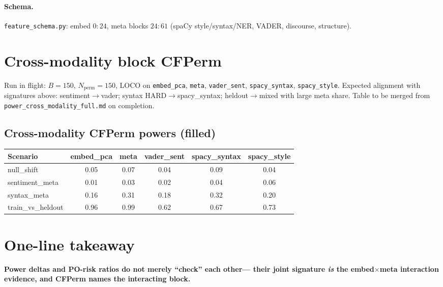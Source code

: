 \documentclass[11pt]{article}
\begin{document}
\paragraph{Schema.}
\texttt{feature\_schema.py}: embed $0{:}24$, meta blocks $24{:}61$
(spaCy style/syntax/NER, VADER, discourse, structure).

\section{Cross-modality block CFPerm}
Run in flight: $B{=}150$, $N_{\mathrm{perm}}{=}150$, LOCO on
\texttt{embed\_pca}, \texttt{meta}, \texttt{vader\_sent}, \texttt{spacy\_syntax},
\texttt{spacy\_style}. Expected alignment with signatures above:
sentiment$\to$vader; syntax HARD$\to$spacy\_syntax; heldout$\to$mixed with
large meta share. Table to be merged from
\texttt{power\_cross\_modality\_full.md} on completion.

\subsection{Cross-modality CFPerm powers (filled)}
\begin{center}
\begin{tabular}{lccccc}
\toprule
Scenario & embed\_pca & meta & vader\_sent & spacy\_syntax & spacy\_style \\
\midrule
null\_shift & 0.05 & 0.07 & 0.04 & 0.09 & 0.04 \\
sentiment\_meta & 0.01 & 0.03 & 0.02 & 0.04 & 0.06 \\
syntax\_meta & 0.16 & 0.31 & 0.18 & 0.32 & 0.20 \\
train\_vs\_heldout & 0.96 & 0.99 & 0.62 & 0.67 & 0.73 \\
\bottomrule
\end{tabular}
\end{center}

\section{One-line takeaway}
\textbf{Power deltas and PO-risk ratios do not merely ``check'' each other---
their joint signature \emph{is} the embed$\times$meta interaction evidence,
and CFPerm names the interacting block.}
\end{document}
